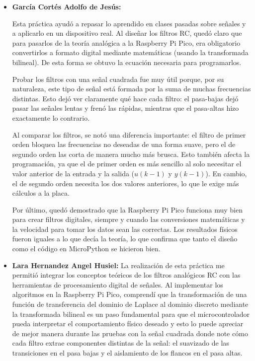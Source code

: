 \documentclass[letterpaper,12pt]{article}
\begin{document}
\begin{itemize}
        \item \textbf{García Cortés Adolfo de Jesús:}
        
        Esta práctica ayudó a repasar lo aprendido en clases pasadas sobre señales y a aplicarlo en un dispositivo real. Al diseñar los filtros RC, quedó claro que para pasarlos de la teoría analógica a la Raspberry Pi Pico, era obligatorio convertirlos a formato digital mediante matemáticas (usando la transformada bilineal). De esta forma se obtuvo la ecuación necesaria para programarlos.

        Probar los filtros con una señal cuadrada fue muy útil porque, por su naturaleza, este tipo de señal está formada por la suma de muchas frecuencias distintas. Esto dejó ver claramente qué hace cada filtro: el pasa-bajas dejó pasar las señales lentas y frenó las rápidas, mientras que el pasa-altas hizo exactamente lo contrario.

        Al comparar los filtros, se notó una diferencia importante: el filtro de primer orden bloquea las frecuencias no deseadas de una forma suave, pero el de segundo orden las corta de manera mucho más brusca. Esto también afecta la programación, ya que el de primer orden es más sencillo al solo necesitar el valor anterior de la entrada y la salida ($u(k-1)$ y $y(k-1)$). En cambio, el de segundo orden necesita los dos valores anteriores, lo que le exige más cálculos a la placa.

        Por último, quedó demostrado que la Raspberry Pi Pico funciona muy bien para crear filtros digitales, siempre y cuando las conversiones matemáticas y la velocidad para tomar los datos sean las correctas. Los resultados físicos fueron iguales a lo que decía la teoría, lo que confirma que tanto el diseño como el código en MicroPython se hicieron bien.



        \item \textbf{Lara Hernandez Angel Husiel:}
        La realización de esta práctica me permitió integrar los conceptos teóricos de los filtros analógicos RC con las herramientas de procesamiento digital de señales. Al implementar los algoritmos en la Raspberry Pi Pico, comprendí que la transformación de una función de transferencia del dominio de Laplace al dominio discreto mediante la transformada bilineal es un paso fundamental para que el microcontrolador pueda interpretar el comportamiento físico deseado y esto lo puede apreciar de mejor manera durante las pruebas con la señal cuadrada donde note cómo cada filtro extrae componentes distintas de la señal: el suavizado de las transiciones en el pasa bajas y el aislamiento de los flancos en el pasa altas.


\end{itemize}
\end{document}
